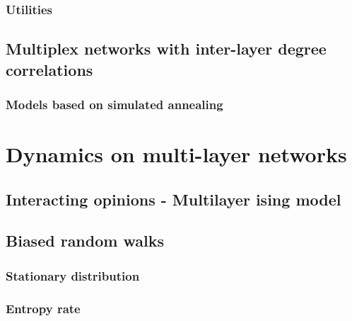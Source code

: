 \documentclass[a4paper,11pt]{book}
\begin{document}

\clearpage


\subsection{Utilities}


\clearpage

\section{Multiplex networks with inter-layer degree correlations}

\subsection{Models based on simulated annealing}



\clearpage


\chapter{Dynamics on multi-layer networks}

\section{Interacting opinions - Multilayer ising model}


\clearpage

\section{Biased random walks}

\subsection{Stationary distribution}


\clearpage

\subsection{Entropy rate}




\clearpage
\end{document}
